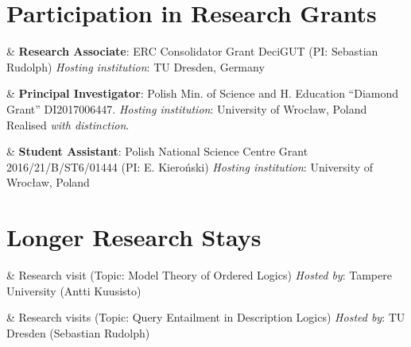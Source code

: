 \documentclass[10pt,a4paper]{article}
\begin{document}
\section{Participation in Research Grants}

\begin{EntriesTableDuration}
    & 
  \textbf{Research Associate}: ERC Consolidator Grant DeciGUT (PI: Sebastian Rudolph)\newline
  \emph{Hosting institution}: TU Dresden, Germany
\end{EntriesTableDuration}

\begin{EntriesTableDuration}
    & 
  \textbf{Principal Investigator}: Polish Min. of Science and H. Education ``Diamond Grant''  DI2017006447.\newline
  \emph{Hosting institution}: University of Wrocław, Poland\newline
  Realised \emph{with distinction}.
\end{EntriesTableDuration}

\begin{EntriesTableDuration}
    & 
  \textbf{Student Assistant}: Polish National Science Centre Grant 2016/21/B/ST6/01444 (PI: E. Kieroński)\newline
  \emph{Hosting institution}: University of Wrocław, Poland
\end{EntriesTableDuration}


\section{Longer Research Stays}

\begin{EntriesTableYear}
    & 
  Research visit (Topic: Model Theory of Ordered Logics)\newline
  \emph{Hosted by}: Tampere University (Antti Kuusisto)
\end{EntriesTableYear}

\begin{EntriesTableYear}
    & 
  Research visits (Topic: Query Entailment in Description Logics)\newline
  \emph{Hosted by}: TU Dresden (Sebastian Rudolph)
\end{EntriesTableYear}
\end{document}
